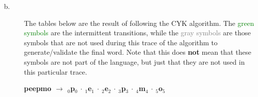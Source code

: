 \documentclass[11pt]{article}
\begin{document}
\begin{solution}
\begin{description}


\item[b.] The tables below are the result of following the CYK algorithm. The \textcolor{Green}{green symbols} are the intermittent transitions, while the \textcolor{Gray}{gray symbols} are those symbols that are not used during this trace of the algorithm to generate/validate the final word. Note that this does \textbf{not} mean that these symbols are not part of the language, but just that they are not used in this particular trace.

\newpage

    \textbf{peepmo $\rightarrow$ $_{0}$p$_{0}$ $\cdot$ $_{1}$e$_{1}$ $\cdot$ $_{2}$e$_{2}$ $\cdot$ $_{3}$p$_{3}$ $\cdot$ $_{4}$m$_{4}$ $\cdot$ $_{5}$o$_{5}$ }


\end{description}
\end{solution}
\end{document}
